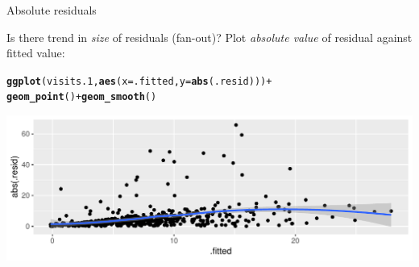 \documentclass[unknownkeysallowed]{beamer}\usepackage[]{graphicx}\usepackage[]{color}
\makeatletter
\def\maxwidth{ %
  \ifdim\Gin@nat@width>\linewidth
    \linewidth
  \else
    \Gin@nat@width
  \fi
}
\newcommand{\hlopt}[1]{\textcolor[rgb]{0,0,0}{#1}}%
\newcommand{\hlstd}[1]{\textcolor[rgb]{0.345,0.345,0.345}{#1}}%
\newcommand{\hlkwc}[1]{\textcolor[rgb]{0.333,0.667,0.333}{#1}}%
\newcommand{\hlkwd}[1]{\textcolor[rgb]{0.737,0.353,0.396}{\textbf{#1}}}%
\newenvironment{kframe}{%
 \def\at@end@of@kframe{}%
 \ifinner\ifhmode%
  \def\at@end@of@kframe{\end{minipage}}%
  \begin{minipage}{\columnwidth}%
 \fi\fi%
 \def\FrameCommand##1{\hskip\@totalleftmargin \hskip-\fboxsep
 \colorbox{shadecolor}{##1}\hskip-\fboxsep
     \hskip-\linewidth \hskip-\@totalleftmargin \hskip\columnwidth}%
 \MakeFramed {\advance\hsize-\width
   \@totalleftmargin\z@ \linewidth\hsize
   \@setminipage}}%
 {\par\unskip\endMakeFramed%
 \at@end@of@kframe}
\newenvironment{knitrout}{}{} %
\makeatother
\begin{document}
\begin{frame}[fragile]{Absolute residuals}
  
Is there trend in \emph{size} of residuals (fan-out)? Plot
\emph{absolute value} of residual against fitted value:

\begin{knitrout}
\color{fgcolor}\begin{kframe}
\begin{alltt}
\hlkwd{ggplot}\hlstd{(visits.1,}\hlkwd{aes}\hlstd{(}\hlkwc{x}\hlstd{=.fitted,}\hlkwc{y}\hlstd{=}\hlkwd{abs}\hlstd{(.resid)))}\hlopt{+}
  \hlkwd{geom_point}\hlstd{()}\hlopt{+}\hlkwd{geom_smooth}\hlstd{()}
\end{alltt}


{\ttfamily\noindent\itshape{}}\end{kframe}
\includegraphics[width=\maxwidth]{figure/unnamed-chunk-30-1} 

\end{knitrout}
  
\end{frame}
\end{document}
